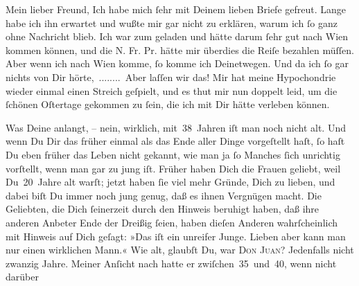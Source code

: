 \pstart{}Mein lieber Freund,\pend\vspace{0.5em}
\pstart
           Ich habe mich{ }ſehr mit Deinem lieben Briefe gefreut. Lange habe ich ihn erwartet und
               wußte mir gar nicht zu erklären, warum ich{ }ſo ganz ohne Nachricht blieb. Ich war  zum \label{K_L02911-1v}\label{K_L02911-1} geladen und hätte darum{ }ſehr gut nach Wien kommen können, und die N. Fr. Pr. hätte mir überdies die Reiſe bezahlen müſſen. Aber
               wenn ich nach Wien komme,{ }ſo komme ich
               Deinetwegen. Und da ich{ }ſo gar nichts von Dir hörte, ........ Aber laſſen wir das! Mir hat meine Hypochondrie wieder einmal \strikeout{\textcolor{gray}{×}} einen Streich geſpielt, und es thut mir nun doppelt leid, um die{ }ſchönen
               Oſtertage gekommen zu{ }ſein, {\pb}die ich mit Dir hätte
               verleben können.\pend
           
\pstart
           Was Deine \label{K_L02911-2v}\label{K_L02911-2} anlangt, – nein, wirklich, mit 38 Jahren iſt man noch nicht alt.
               Und wenn Du Dir das früher einmal als das Ende aller Dinge vorgeſtellt haſt,{ }ſo haſt
               Du eben früher das Leben nicht gekannt, wie man ja{ }ſo Manches{ }ſich unrichtig
               vorſtellt, wenn man gar zu jung iſt. Früher haben Dich die Frauen geliebt, weil
               Du 20 Jahre alt warſt; jetzt haben{ }ſie viel mehr Gründe, Dich zu lieben, und dabei
               biſt Du immer noch jung genug, daß es ihnen Vergnügen macht. Die Geliebten, die Dich{ }ſeinerzeit durch \introOben{}den\introOben{} Hinweis  beruhigt haben, daß ihre anderen Anbeter Ende der Dreißig{ }ſeien, haben
               dieſen Anderen wahrſcheinlich mit Hinweis auf Dich geſagt: »Das iſt {\pb}ein unreifer Junge. Lieben aber kann man nur einen
               wirklichen Mann.« Wie alt, glaubſt Du, war \textsc{Don Juan}?
               Jedenfalls nicht zwanzig Jahre. Meiner Anſicht nach hatte er zwiſchen 35 und 40, wenn
               nicht darüber{\dotsseven}\pend
           
